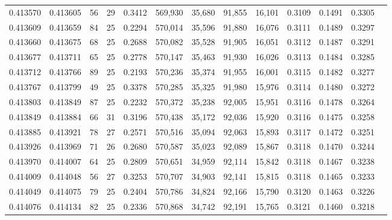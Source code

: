 \begin{tabular}{rrrrrrrrrrrrr}
0.413570 & 0.413605 &    56 &  29 &                                     0.3412 & 569,930 &  35,680 &  91,855 &  16,101 & 0.3109 & 0.1491 & 0.3305 \\
0.413609 & 0.413659 &    84 &  25 &                                     0.2294 & 570,014 &  35,596 &  91,880 &  16,076 & 0.3111 & 0.1489 & 0.3297 \\
0.413660 & 0.413675 &    68 &  25 &                                     0.2688 & 570,082 &  35,528 &  91,905 &  16,051 & 0.3112 & 0.1487 & 0.3291 \\
0.413677 & 0.413711 &    65 &  25 &                                     0.2778 & 570,147 &  35,463 &  91,930 &  16,026 & 0.3113 & 0.1484 & 0.3285 \\
0.413712 & 0.413766 &    89 &  25 &                                     0.2193 & 570,236 &  35,374 &  91,955 &  16,001 & 0.3115 & 0.1482 & 0.3277 \\
0.413767 & 0.413799 &    49 &  25 &                                     0.3378 & 570,285 &  35,325 &  91,980 &  15,976 & 0.3114 & 0.1480 & 0.3272 \\
0.413803 & 0.413849 &    87 &  25 &                                     0.2232 & 570,372 &  35,238 &  92,005 &  15,951 & 0.3116 & 0.1478 & 0.3264 \\
0.413849 & 0.413884 &    66 &  31 &                                     0.3196 & 570,438 &  35,172 &  92,036 &  15,920 & 0.3116 & 0.1475 & 0.3258 \\
0.413885 & 0.413921 &    78 &  27 &                                     0.2571 & 570,516 &  35,094 &  92,063 &  15,893 & 0.3117 & 0.1472 & 0.3251 \\
0.413926 & 0.413969 &    71 &  26 &                                     0.2680 & 570,587 &  35,023 &  92,089 &  15,867 & 0.3118 & 0.1470 & 0.3244 \\
0.413970 & 0.414007 &    64 &  25 &                                     0.2809 & 570,651 &  34,959 &  92,114 &  15,842 & 0.3118 & 0.1467 & 0.3238 \\
0.414009 & 0.414048 &    56 &  27 &                                     0.3253 & 570,707 &  34,903 &  92,141 &  15,815 & 0.3118 & 0.1465 & 0.3233 \\
0.414049 & 0.414075 &    79 &  25 &                                     0.2404 & 570,786 &  34,824 &  92,166 &  15,790 & 0.3120 & 0.1463 & 0.3226 \\
0.414076 & 0.414134 &    82 &  25 &                                     0.2336 & 570,868 &  34,742 &  92,191 &  15,765 & 0.3121 & 0.1460 & 0.3218 \\

\end{tabular}
